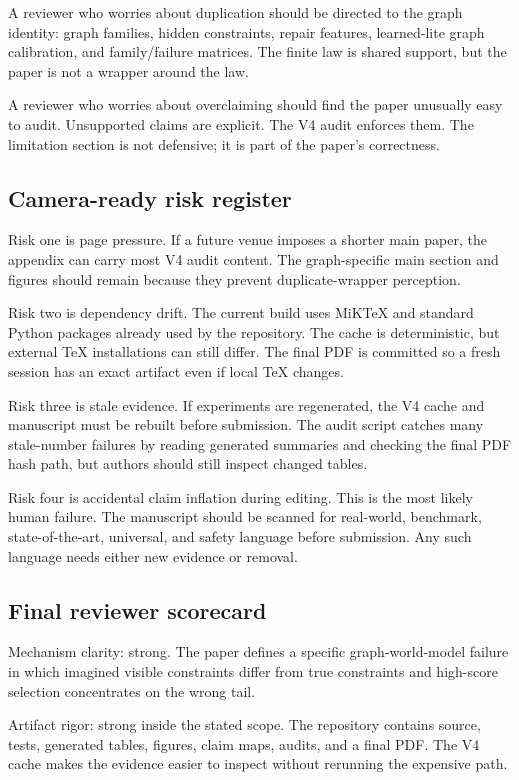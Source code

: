 \documentclass{article}
\begin{document}
A reviewer who worries about duplication should be directed to the graph
identity: graph families, hidden constraints, repair features, learned-lite
graph calibration, and family/failure matrices.  The finite law is shared
support, but the paper is not a wrapper around the law.

A reviewer who worries about overclaiming should find the paper unusually easy
to audit.  Unsupported claims are explicit.  The V4 audit enforces them.  The
limitation section is not defensive; it is part of the paper's correctness.

\subsection{Camera-ready risk register}

Risk one is page pressure.  If a future venue imposes a shorter main paper, the
appendix can carry most V4 audit content.  The graph-specific main section and
figures should remain because they prevent duplicate-wrapper perception.

Risk two is dependency drift.  The current build uses MiKTeX and standard
Python packages already used by the repository.  The cache is deterministic, but
external TeX installations can still differ.  The final PDF is committed so a
fresh session has an exact artifact even if local TeX changes.

Risk three is stale evidence.  If experiments are regenerated, the V4 cache and
manuscript must be rebuilt before submission.  The audit script catches many
stale-number failures by reading generated summaries and checking the final PDF
hash path, but authors should still inspect changed tables.

Risk four is accidental claim inflation during editing.  This is the most likely
human failure.  The manuscript should be scanned for real-world, benchmark,
state-of-the-art, universal, and safety language before submission.  Any such
language needs either new evidence or removal.

\subsection{Final reviewer scorecard}

Mechanism clarity: strong.  The paper defines a specific graph-world-model
failure in which imagined visible constraints differ from true constraints and
high-score selection concentrates on the wrong tail.

Artifact rigor: strong inside the stated scope.  The repository contains source,
tests, generated tables, figures, claim maps, audits, and a final PDF.  The V4
cache makes the evidence easier to inspect without rerunning the expensive path.
\end{document}

